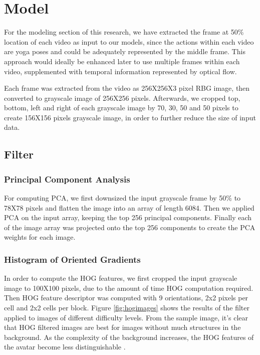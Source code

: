 \documentclass[
	a4paper, %
	10pt, %
	unnumberedsections, %
	twoside, %
]{t0004}
\begin{document}
\section{Model}

For the modeling section of this research, we have extracted the frame at 50\% location of each video as input to our models, since the actions within each video are yoga poses and could be adequately represented by the middle frame. This approach would ideally be enhanced later to use multiple frames within each video, supplemented with temporal information represented by optical flow.

Each frame was extracted from the video as 256X256X3 pixel RBG image, then converted to grayscale image of 256X256 pixels. Afterwards, we cropped top, bottom, left and right of each grayscale image by 70, 30, 50 and 50 pixels to create 156X156 pixels grayscale image, in order to further reduce the size of input data.

\subsection{Filter}

\subsubsection{Principal Component Analysis} For computing PCA, we first downsized the input grayscale frame by 50\% to 78X78 pixels and flatten the image into an array of length 6084. Then we applied PCA on the input array, keeping the top 256 principal components. Finally each of the image array was projected onto the top 256 components to create the PCA weights for each image.

\subsubsection{Histogram of Oriented Gradients} In order to compute the HOG features, we first cropped the input grayscale image to 100X100 pixels, due to the amount of time HOG computation required. Then HOG feature descriptor was computed with 9 orientations, 2x2 pixels per cell and 2x2 cells per block. Figure \ref{fig:hogimages} shows the results of the filter applied to images of different difficulty levels. From the sample image, it's clear that HOG filtered images are best for images without much structures in the background. As the complexity of the background increases, the HOG features of the avatar become less distinguishable .
\end{document}
